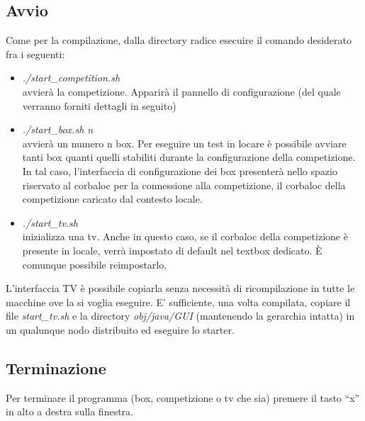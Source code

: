 \subsection{Avvio}
Come per la compilazione, dalla directory radice esecuire il comando desiderato fra i seguenti:
\begin{itemize}
\item \emph{./start\_competition.sh}\\
avvier\`{a} la competizione. Apparir\`{a} il pannello di configurazione (del quale verranno forniti dettagli in seguito)
\item \emph{./start\_box.sh n}\\
avvier\`{a} un numero n box. Per eseguire un test in locare \`{e} possibile avviare tanti box quanti quelli stabiliti durante la configurazione
della competizione. In tal caso, l'interfaccia di configurazione dei box presenter\`{a} nello spazio riservato al corbaloc per la connessione
alla competizione, il corbaloc della competizione caricato dal contesto locale.
\item \emph{./start\_tv.sh}\\
inizializza una tv. Anche in questo caso, se il corbaloc della competizione \`{e} presente in locale, verr\`{a} impostato di default nel textbox
dedicato. \`{E} comunque possibile reimpostarlo.
\end{itemize}
L'interfaccia TV \`{e} possibile copiarla senza necessit\`{a} di ricompilazione in tutte le macchine ove la si voglia eseguire. E' sufficiente,
una volta compilata, copiare il file \emph{start\_tv.sh} e la directory \emph{obj/java/GUI} (mantenendo la gerarchia intatta) in un qualunque
nodo distribuito ed eseguire lo starter.
\subsection{Terminazione}
Per terminare il programma (box, competizione o tv che sia) premere il tasto ``x'' in alto a destra sulla finestra.
